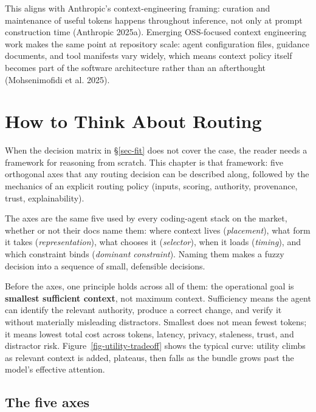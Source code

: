 \documentclass[
  11pt,
  letterpaper,
  numbers=noendperiod,
  parskip=half]{scrartcl}
\begin{document}
\figurePhaseHeatmap

This aligns with Anthropic's context-engineering framing: curation and
maintenance of useful tokens happens throughout inference, not only at
prompt construction time (Anthropic 2025a). Emerging OSS-focused context
engineering work makes the same point at repository scale: agent
configuration files, guidance documents, and tool manifests vary widely,
which means context policy itself becomes part of the software
architecture rather than an afterthought (Mohsenimofidi et al. 2025).

\section{How to Think About Routing}\label{sec-routing}

When the decision matrix in \S\ref{sec-fit} does not cover the case, the
reader needs a framework for reasoning from scratch. This chapter is
that framework: five orthogonal axes that any routing decision can be
described along, followed by the mechanics of an explicit routing
policy (inputs, scoring, authority, provenance, trust, explainability).

The axes are the same five used by every coding-agent stack on the
market, whether or not their docs name them: where context lives
(\emph{placement}), what form it takes (\emph{representation}), what
chooses it (\emph{selector}), when it loads (\emph{timing}), and which
constraint binds (\emph{dominant constraint}). Naming them makes a
fuzzy decision into a sequence of small, defensible decisions.

Before the axes, one principle holds across all of them: the operational
goal is \textbf{smallest sufficient context}, not maximum context.
Sufficiency means the agent can identify the relevant authority,
produce a correct change, and verify it without materially misleading
distractors. Smallest does not mean fewest tokens; it means lowest
total cost across tokens, latency, privacy, staleness, trust, and
distractor risk. Figure~\ref{fig-utility-tradeoff} shows the typical
curve: utility climbs as relevant context is added, plateaus, then
falls as the bundle grows past the model's effective attention.

\figureUtilityTradeoff

\subsection*{The five axes}
\end{document}
